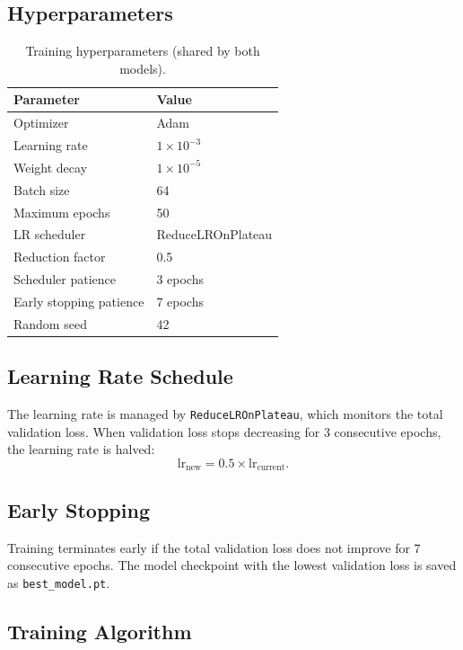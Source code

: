 \documentclass[11pt,a4paper]{article}
\begin{document}
\subsection{Hyperparameters}

\begin{table}[H]
\centering
\caption{Training hyperparameters (shared by both models).}
\label{tab:hparams}
\begin{tabular}{@{}ll@{}}
\toprule
\textbf{Parameter} & \textbf{Value} \\
\midrule
Optimizer             & Adam \\
Learning rate         & $1 \times 10^{-3}$ \\
Weight decay          & $1 \times 10^{-5}$ \\
Batch size            & 64 \\
Maximum epochs        & 50 \\
LR scheduler          & ReduceLROnPlateau \\
\quad Reduction factor & 0.5 \\
\quad Scheduler patience & 3 epochs \\
Early stopping patience & 7 epochs \\
Random seed           & 42 \\
\bottomrule
\end{tabular}
\end{table}

\subsection{Learning Rate Schedule}

The learning rate is managed by \texttt{ReduceLROnPlateau}, which monitors
the total validation loss. When validation loss stops decreasing for 3
consecutive epochs, the learning rate is halved:
\[
    \text{lr}_\text{new} = 0.5 \times \text{lr}_\text{current}.
\]

\subsection{Early Stopping}

Training terminates early if the total validation loss does not improve for
7 consecutive epochs. The model checkpoint with the lowest validation loss is
saved as \texttt{best\_model.pt}.

\subsection{Training Algorithm}
\end{document}
